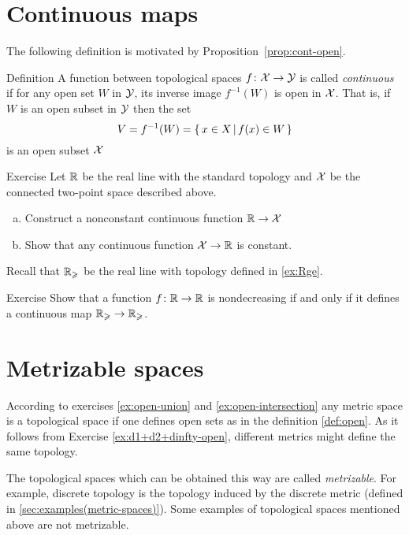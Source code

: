 \section{Continuous maps}

The following definition is motivated by Proposition~\ref{prop:cont-open}.

\begin{thm}{Definition}\label{def:cont-top}
A function between topological spaces 
$f\colon\mathcal{X}\to\mathcal{Y}$ is called \emph{continuous} if for any open set $W$ in $\mathcal{Y}$, its inverse image $f^{-1}(W)$ is open in $\mathcal{X}$.
That is, if $W$ is an open subset in $\mathcal{Y}$ then the set
\[V=f^{-1}(W)=\left\{\,{x\in X}\,\middle|\,{f(x)\in W}\,\right\}\]
is an open subset $\mathcal{X}$
\end{thm}

\begin{thm}{Exercise}
Let $\mathbb{R}$ be the real line with the standard topology
and $\mathcal{X}$ be the connected two-point space described above.
\begin{enumerate}[(a)]
\item Construct a nonconstant continuous function $\mathbb{R}\to \mathcal{X}$
\item Show that any continuous function $\mathcal{X}\to \mathbb{R}$ is constant.
\end{enumerate}

\end{thm}

Recall that $\mathbb{R}_\geqslant$ be the real line with topology defined in \ref{ex:Rge}.

\begin{thm}{Exercise} 
Show that a function $f\colon\mathbb{R}\to\mathbb{R}$ is nondecreasing if and only if it defines a continuous map $\mathbb{R}_\geqslant\to \mathbb{R}_\geqslant$.
\end{thm}


\section{Metrizable spaces}

According to exercises \ref{ex:open-union} and \ref{ex:open-intersection} any metric space is a topological space if one defines open sets as in the definition \ref{def:open}.
As it follows from Exercise \ref{ex:d1+d2+dinfty-open},
different metrics might define the same topology.

The topological spaces which can be obtained this way are called \emph{metrizable}.
For example, discrete topology is the topology induced by the discrete metric (defined in \ref{sec:examples(metric-spaces)}).
Some examples of topological spaces mentioned above are not metrizable.

